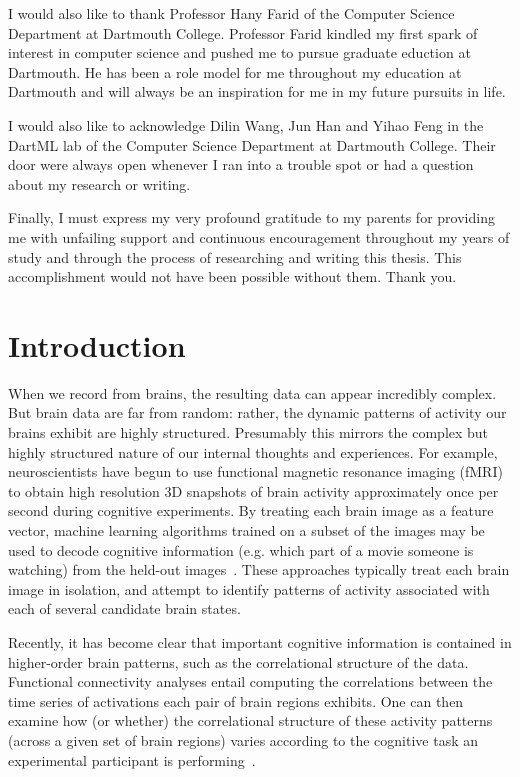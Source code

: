 \documentclass[12pt]{article}
\begin{document}
I would also like to thank Professor Hany Farid of the Computer Science Department at Dartmouth College. Professor Farid kindled my first spark of interest in computer science and pushed me to pursue graduate eduction at Dartmouth. He has been a role model for me throughout my education at Dartmouth and will always be an inspiration for me in my future pursuits in life.\par

I would also like to acknowledge Dilin Wang, Jun Han and Yihao Feng in the DartML lab of the Computer Science Department at Dartmouth College. Their door were always open whenever I ran into a trouble spot or had a question about my research or writing.\par

Finally, I must express my very profound gratitude to my parents for providing me with unfailing support and continuous encouragement throughout my years of study and through the process of researching and writing this thesis. This accomplishment would not have been possible without them. Thank you.
\newpage
\tableofcontents
\newpage
{}
\section{Introduction}
When we record from brains, the resulting data can appear incredibly
complex.  But brain data are far from random: rather, the dynamic
patterns of activity our brains exhibit are highly structured.
Presumably this mirrors the complex but highly structured nature of
our internal thoughts and experiences.  For example, neuroscientists
have begun to use functional magnetic resonance imaging (fMRI) to
obtain high resolution 3D snapshots of brain activity
approximately once per second during cognitive experiments.  By
treating each brain image as a feature vector, machine learning
algorithms trained on a subset of the images may be used to decode
cognitive information (e.g. which part of a movie someone is watching)
from the held-out images~\citep{NormEtal06b}.  These approaches
typically treat each brain image in isolation, and attempt to identify
patterns of activity associated with each of several candidate brain states.

Recently, it has become clear that important cognitive information is
contained in higher-order brain patterns, such as the correlational
structure of the data.  Functional connectivity analyses entail
computing the correlations between the time series of activations each
pair of brain regions exhibits.  One can then examine how (or whether)
the correlational structure of these activity patterns (across a given
set of brain regions) varies according to the cognitive task an
experimental participant is performing~\citep{Turk13}.
\end{document}
